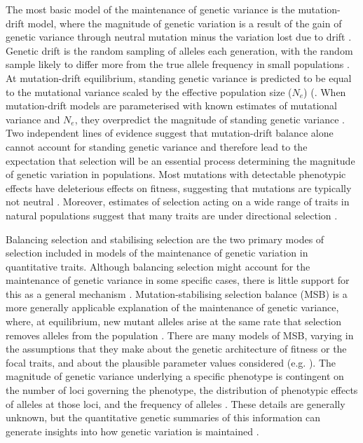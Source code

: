 The most basic model of the maintenance of genetic variance is the mutation-drift model, where the magnitude of genetic variation is a result of the gain of genetic variance through neutral mutation minus the variation lost due to drift \citep{Fran80, Bart90}. Genetic drift is the random sampling of alleles each generation, with the random sample likely to differ more from the true allele frequency in small populations \citep{Land76}. At mutation-drift equilibrium, standing genetic variance is predicted to be equal to the mutational variance scaled by the effective population size ($N_e$) (\citep{Lync86}. When mutation-drift models are parameterised with known estimates of mutational variance and $N_e$, they overpredict the magnitude of standing genetic variance \citep{John05, Wals18, McGu15}. Two independent lines of evidence suggest that mutation-drift balance alone cannot account for standing genetic variance and therefore lead to the expectation that selection will be an essential process determining the magnitude of genetic variation in populations. Most mutations with detectable phenotypic effects have deleterious effects on fitness, suggesting that mutations are typically not neutral \citep{Kond92, Hall09}. Moreover, estimates of selection acting on a wide range of traits in natural populations suggest that many traits are under directional selection \citep{King01, King12}.\par  

Balancing selection and stabilising selection are the two primary modes of selection included in models of the maintenance of genetic variation in quantitative traits. Although balancing selection might account for the maintenance of genetic variance in some specific cases, there is little support for this as a general mechanism \citep{Bart90, John05, Hedr12}. Mutation-stabilising selection balance (MSB) is a more generally applicable explanation of the maintenance of genetic variance, where, at equilibrium, new mutant alleles arise at the same rate that selection removes alleles from the population \citep{Trot01, John05, Zhan05}. There are many models of MSB, varying in the assumptions that they make about the genetic architecture of fitness or the focal traits, and about the plausible parameter values considered (e.g. \citealt{Latt70, Land75, Ture85, Keig88, Burg89, Kond92, Houl96, John05, Wals18}). The magnitude of genetic variance underlying a specific phenotype is contingent on the number of loci governing the phenotype, the distribution of phenotypic effects of alleles at those loci, and the frequency of alleles \citep{Ture88}. These details are generally unknown, but the quantitative genetic summaries of this information can generate insights into how genetic variation is maintained \citep{John05}.\par

